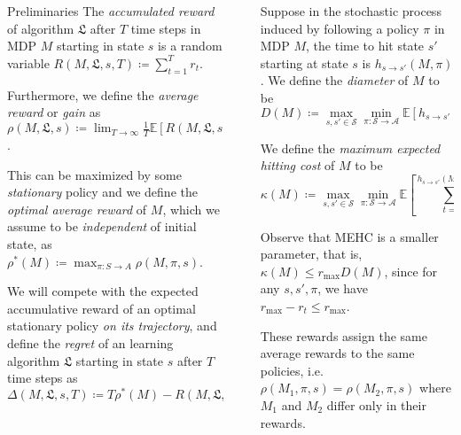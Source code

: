 \documentclass[final]{beamer}
\newcommand{\Exp}{\mathbb{E}}
\newlength{\sepwidth}
\newlength{\colwidth}
\newcommand{\separatorcolumn}{\begin{column}{\sepwidth}\end{column}}
\begin{document}
\begin{frame}[t]
\begin{columns}[t]
\begin{column}{\colwidth}
\begin{block}{Preliminaries}
    The \textit{accumulated reward} of algorithm $\mathfrak{L}$ after $T$ time steps in MDP $M$ starting in state $s$ is a random variable $R(M, \mathfrak{L}, s, T) \coloneqq \sum_{t=1}^T r_t$.
  
    Furthermore, we define the \textit{average reward} or \textit{gain} as $\rho(M, \mathfrak{L}, s) \coloneqq \lim_{T \rightarrow \infty} \frac{1}{T} \Exp \left[ R(M, \mathfrak{L}, s, T) \right]$.
    
    This can be maximized by some \textit{stationary} policy and we define the \textit{optimal average reward} of $M$, which we assume to be \textit{independent} of initial state, as $\rho^*(M) \coloneqq \max_{\pi : S \rightarrow A} \rho(M, \pi, s)$.
    
    We will compete with the expected accumulative reward of an optimal stationary policy \textit{on its trajectory}, and define the \textit{regret} of an learning algorithm $\mathfrak{L}$ starting in state $s$ after $T$ time steps as
    $$ \Delta(M, \mathfrak{L}, s, T) \coloneqq T \rho^*(M) - R(M, \mathfrak{L}, s, T). $$
 
  \end{block}

\end{column}

\separatorcolumn

\begin{column}{\colwidth}

  Suppose in the stochastic process induced by following a policy $\pi$ in MDP $M$, the time to hit state $s'$ starting at state $s$ is $h_{s \rightarrow s'}(M, \pi)$. We define the \emph{diameter} of $M$ \cite{jaksch2010near} to be
  $$ D(M) \coloneqq \max_{s, s' \in \mathcal{S}} \min_{\pi : \mathcal{S} \rightarrow \mathcal{A}} \Exp \left[ h_{s \rightarrow s'}(M, \pi) \right]. $$
  
  We define the \emph{maximum expected hitting cost} of $M$ to be
  $$ \kappa(M) \coloneqq \max_{s, s' \in \mathcal{S}} \min_{\pi : \mathcal{S} \rightarrow \mathcal{A}} \Exp \left[ \sum_{t=0}^{h_{s \rightarrow s'}(M, \pi) - 1} r_\text{max} - r_t \right]. $$
  
  Observe that MEHC is a smaller parameter, that is, $\kappa(M) \leq r_\text{max} D(M)$, since for any $s, s', \pi$, we have $r_\text{max} - r_t \leq r_\text{max}$.
  
  These rewards assign the same average rewards to the same policies, i.e. $\rho(M_1, \pi, s) = \rho(M_2, \pi, s)$ where $M_1$ and $M_2$ differ only in their rewards.
  

\end{column}
\end{columns}
\end{frame}
\end{document}
